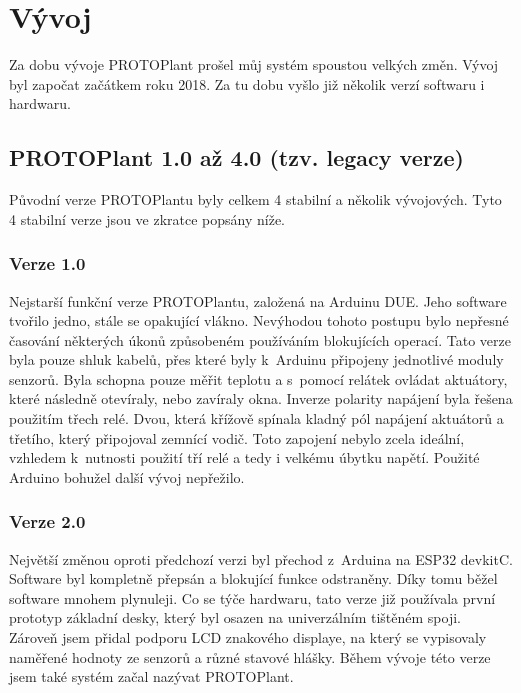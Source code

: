 \chapter{Vývoj}
Za dobu vývoje PROTOPlant prošel můj systém spoustou velkých změn.
Vývoj byl započat začátkem roku 2018.
Za tu dobu vyšlo již několik verzí softwaru i hardwaru.

\section{PROTOPlant 1.0 až 4.0 (tzv. legacy verze)}
Původní verze PROTOPlantu byly celkem 4 stabilní a několik vývojových.
Tyto 4 stabilní verze jsou ve zkratce popsány níže.

\subsection{Verze 1.0}
Nejstarší funkční verze PROTOPlantu, založená na Arduinu DUE. 
Jeho software tvořilo jedno, stále se opakující vlákno.
Nevýhodou tohoto postupu bylo nepřesné časování některých úkonů způsobeném používáním blokujících operací.
Tato verze byla pouze shluk kabelů, přes které byly k~Arduinu připojeny jednotlivé moduly senzorů.
Byla schopna pouze měřit teplotu a s~pomocí relátek ovládat aktuátory, které následně otevíraly, nebo zavíraly okna.
Inverze polarity napájení byla řešena použitím třech relé.
Dvou, která křížově spínala kladný pól napájení aktuátorů a třetího, který připojoval zemnící vodič.
Toto zapojení nebylo zcela ideální, vzhledem k~nutnosti použití tří relé a tedy i velkému úbytku napětí.
Použité Arduino bohužel další vývoj nepřežilo.

\subsection{Verze 2.0}
Největší změnou oproti předchozí verzi byl přechod z~Arduina na ESP32 devkitC.
Software byl kompletně přepsán a blokující funkce odstraněny.
Díky tomu běžel software mnohem plynuleji.
Co se týče hardwaru, tato verze již používala první prototyp základní desky, který byl osazen na univerzálním tištěném spoji.
Zároveň jsem přidal podporu LCD znakového displaye, na který se vypisovaly naměřené hodnoty ze senzorů a různé stavové hlášky.
Během vývoje této verze jsem také systém začal nazývat PROTOPlant.

